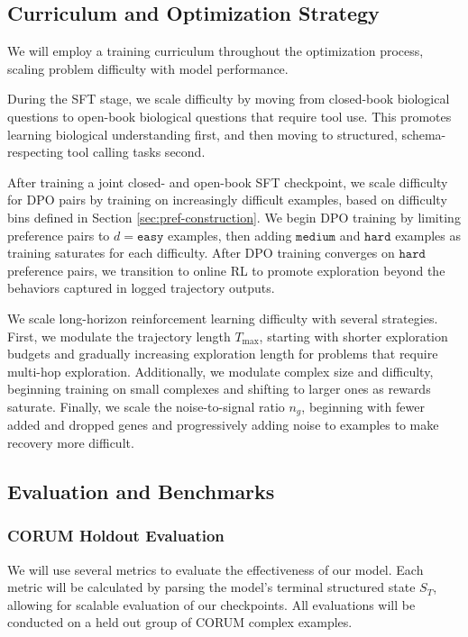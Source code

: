 \documentclass[thesis,letterpaper,12pt]{utthesis}
\begin{document}
\subsection{Curriculum and Optimization Strategy}\label{sec:curriculum}
We will employ a training curriculum throughout the optimization process, scaling problem difficulty with model performance. 

During the SFT stage, we scale difficulty by moving from closed-book biological questions to open-book biological questions that require tool use. This promotes learning biological understanding first, and then moving to structured, schema-respecting tool calling tasks second.

After training a joint closed- and open-book SFT checkpoint, we scale difficulty for DPO pairs by training on increasingly difficult examples, based on difficulty bins defined in Section \ref{sec:pref-construction}. We begin DPO training by limiting preference pairs to $d = \texttt{easy}$ examples, then adding $\texttt{medium}$ and $\texttt{hard}$ examples as training saturates for each difficulty. After DPO training converges on $\texttt{hard}$ preference pairs, we transition to online RL to promote exploration beyond the behaviors captured in logged trajectory outputs.

We scale long-horizon reinforcement learning difficulty with several strategies. First, we modulate the trajectory length $T_{\max}$, starting with shorter exploration budgets and gradually increasing exploration length for problems that require multi-hop exploration. Additionally, we modulate complex size and difficulty, beginning training on small complexes and shifting to larger ones as rewards saturate. Finally, we scale the noise-to-signal ratio $n_g$, beginning with fewer added and dropped genes and progressively adding noise to examples to make recovery more difficult.

\subsection{Evaluation and Benchmarks}\label{sec:eval}
\subsubsection{CORUM Holdout Evaluation}
We will use several metrics to evaluate the effectiveness of our model. Each metric will be calculated by parsing the model's terminal structured state $S_T$, allowing for scalable evaluation of our checkpoints. All evaluations will be conducted on a held out group of CORUM complex examples.
\end{document}

